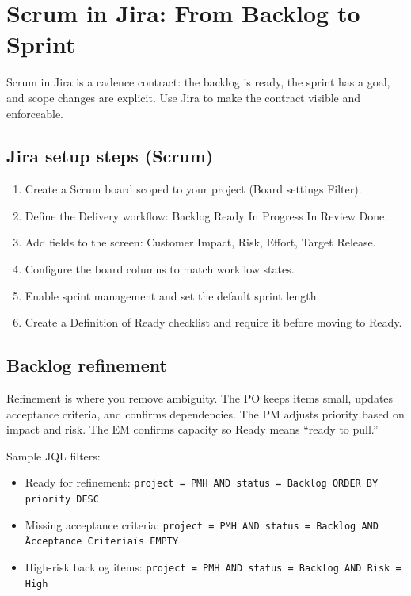 \section{Scrum in Jira: From Backlog to Sprint}
Scrum in Jira is a cadence contract: the backlog is ready, the sprint has a goal, and scope changes are explicit. Use Jira to make the contract visible and enforceable.

\subsection{Jira setup steps (Scrum)}
\begin{enumerate}
  \item Create a Scrum board scoped to your project (Board settings \textrightarrow{} Filter).
  \item Define the Delivery workflow: Backlog \textrightarrow{} Ready \textrightarrow{} In Progress \textrightarrow{} In Review \textrightarrow{} Done.
  \item Add fields to the screen: Customer Impact, Risk, Effort, Target Release.
  \item Configure the board columns to match workflow states.
  \item Enable sprint management and set the default sprint length.
  \item Create a Definition of Ready checklist and require it before moving to Ready.
\end{enumerate}

\subsection{Backlog refinement}
Refinement is where you remove ambiguity. The PO keeps items small, updates acceptance criteria, and confirms dependencies. The PM adjusts priority based on impact and risk. The EM confirms capacity so Ready means “ready to pull.”

Sample JQL filters:
\begin{itemize}
  \item Ready for refinement: \texttt{project = PMH AND status = Backlog ORDER BY priority DESC}
  \item Missing acceptance criteria: \texttt{project = PMH AND status = Backlog AND \"Acceptance Criteria\" is EMPTY}
  \item High-risk backlog items: \texttt{project = PMH AND status = Backlog AND Risk = High}
\end{itemize}

